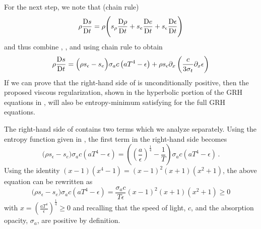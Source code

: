 \documentclass[times,doublespace]{fldauth}%
\begin{document}
\noindent
For the next step, we note that (chain rule)
%
\begin{equation}
\rho \frac{\textrm{D} s}{\textrm{D} t} = \rho \Bigg( s_\rho \frac{\textrm{D} \rho}{\textrm{D} t} + s_e \frac{\textrm{D} e}{\textrm{D} t} +s_\epsilon \frac{\textrm{D} \epsilon}{\textrm{D} t} \Bigg)
\end{equation}
%
and thus combine , , and  using chain rule to obtain
%
\begin{equation} \label{eq:entro_eq_all_terms}
\rho \frac{\textrm{D} s}{\textrm{D} t} = \Big( \rho s_\epsilon -s_e \Big)  \sigma_a c \left( a T^4 - \epsilon \right) +   \rho s_\epsilon \partial_x \left( \frac{c}{3 \sigma_t} \partial_x \epsilon \right) 
\end{equation}
%
If we can prove that the right-hand side of  is unconditionally positive, then the proposed 
viscous regularization, shown in the hyperbolic portion of the GRH equations in , 
will also be entropy-minimum satisfying for the full GRH equations. 

The right-hand side of  contains two terms which we analyze separately. 
Using the entropy function given in , the first term in the right-hand side becomes
%
\begin{equation} 
\Big( \rho s_\epsilon -s_e \Big)  \sigma_a c \left( a T^4 - \epsilon \right) 
= \left( \left( \frac{a}{\epsilon}\right)^\frac{1}{4} - \frac{1}{T} \right)   \sigma_a c \left( a T^4 - \epsilon \right) \,.
\end{equation}
Using the identity $(x-1)(x^4-1) = (x-1)^2(x+1)(x^2+1)$, the above equation can be rewritten as
\begin{equation} 
\Big( \rho s_\epsilon -s_e \Big)  \sigma_a c \left( a T^4 - \epsilon \right) 
= \frac{\sigma_a c}{T \epsilon}  (x-1)^2(x+1)(x^2+1) \geq 0
\end{equation}
%
with $x=  \left(\frac{aT^4}{\epsilon}\right)^\frac{1}{4} \geq 0$ and recalling that the speed of light, $c$,
and the absorption opacity, $\sigma_a$, are positive by definition. 
\end{document}

